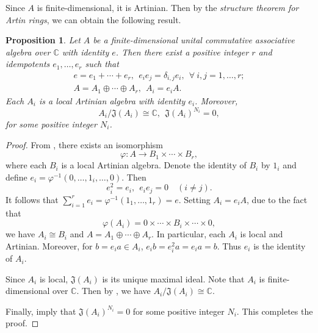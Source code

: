 \documentclass[12pt]{article}
\numberwithin{equation}{section}
\newtheorem{proposition}[theorem]{Proposition}
\theoremstyle{definition}
\theoremstyle{plain}
\newcommand{\bC}{\ensuremath{\mathbb{C}}}
\newcommand{\fJ}{\mathfrak{J}}
\begin{document}
Since $A$ is finite-dimensional, it is Artinian. Then by the \emph{structure theorem for Artin rings}, we can obtain the following result.
\begin{proposition}\label{prop:Artin}
    Let $A$ be a finite-dimensional unital commutative associative algebra over $\bC$ with identity $e$. Then there exist a positive integer $r$ and idempotents $e_1,\dots,e_r$ such that
    \begin{gather*}
        e=e_1+\cdots+e_r,\ \ e_i  e_j=\delta_{i,j}e_i,\ \ \forall\ i,j=1,\dots,r;\\ A=A_1\oplus\cdots\oplus A_r,\ \ A_i=e_i  A.
    \end{gather*}
    Each $A_i$ is a local Artinian algebra with identity $e_i$. Moreover,
    \begin{equation}\label{Artin}
        A_i/\fJ(A_i)\cong \bC,\ \ \fJ(A_i)^{N_i}=0,
    \end{equation}
    for some positive integer $N_i$.
\end{proposition}
\begin{proof}
    From \cite[Theorem~8.7]{AM}, there exists an isomorphism
    \begin{equation*}
        \varphi:A\longrightarrow B_1\times\cdots\times B_r,
    \end{equation*}
    where each $B_i$ is a local Artinian algebra. Denote the identity of $B_i$ by $1_i$ and define $e_i=\varphi^{-1}(0,\ldots,1_i,\ldots,0)$. Then
    \begin{equation*}
        e_i^2=e_i,\ \ e_i  e_j=0\quad(i\ne j).
    \end{equation*}
    It follows that $\sum_{i=1}^{r}e_i=\varphi^{-1}(1_1,\ldots,1_r)=e$. Setting $A_i=e_i  A$, due to the fact that 
    \begin{equation*}
        \varphi(A_i)=0\times\cdots\times B_i\times\cdots\times0,
    \end{equation*}
    we have $A_i\cong B_i$ and $A=A_1\oplus\cdots\oplus A_r$. In particular, each $A_i$ is local and Artinian. Moreover, for $b=e_i  a\in A_i$, $e_i  b=e_i^2  a=e_i  a=b$. Thus $e_i$ is the identity of $A_i$.

    Since $A_i$ is local, $\fJ(A_i)$ is its unique maximal ideal. Note that $A_i$ is finite-dimensional over $\bC$. Then by \cite[Corollary~7.10]{AM}, we have $A_i/\fJ(A_i)\cong \bC$. 

    Finally, \cite[Corollary~8.2 and Proposition~8.4]{AM} imply that $\fJ(A_i)^{N_i}=0$ for some positive integer $N_i$. This completes the proof.
\end{proof}
\end{document}
